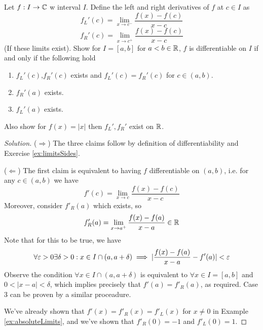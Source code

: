 \begin{exercise} 
  Let $f:I\to\mathbb C$ w interval $I$. Define the left and right derivatives of $f$ at $c\in I$
  as 
  \[f_L'(c) = \lim_{x\to c^-} \frac{f(x)-f(c)}{x-c}\]
  \[f_R'(c) = \lim_{x\to c^+} \frac{f(x)-f(c)}{x-c}\]
  (If these limits exist). Show for $I=[a,b]$ for $a<b\in\mathbb R$, $f$ is differentiable on
  $I$ if and only if the following hold
  \begin{enumerate}
    \item $f_L'(c)$,$f_R'(c)$ exists and $f_L'(c)=f_R'(c)$ for $c\in(a,b)$.
    \item $f_R'(a)$ exists.
    \item $f_L'(a)$ exists.
  \end{enumerate}

  Also show for $f(x)=|x|$ then $f_L',f_R'$ exist on $\mathbb R$.
\end{exercise}
\begin{proof} [Solution]
  ($\Rightarrow$) The three claims follow by definition of differentiability and Exercise
  \ref{ex:limitsSides}.

  ($\Leftarrow$) 
  The first claim is equivalent to having $f$ differentiable on $(a,b)$, i.e. for any $c\in(a,b)$ we
  have 
  \[f'(c)=\lim_{x\to c} \frac{f(x)-f(c)}{x-c}\]
  Moreover, consider $f'_R(a)$ which exists, so
  \[f'_R(a)=\lim_{x\to a^+}\frac{f(x)-f(a)}{x-a} \in\mathbb R\]
  Note that for this to be true, we have 
  \[\forall\varepsilon>0\exists\delta>0 : x\in I\cap (a,a+\delta)\implies
  |\frac{f(x)-f(a)}{x-a} - f'(a)|<\varepsilon\]
  Observe the condition $\forall x\in I\cap (a,a+\delta)$ is equivalent to $\forall x\in
  I=[a,b]$ and $0<|x-a|<\delta$, which implies precisely that
  $f'(a)=f'_R(a)$, as required. Case 3 can be proven by a similar proceadure.

  We've already shown that $f'(x)=f'_R(x)=f'_L(x)$ for $x\neq 0$ in Example
  \ref{ex:absoluteLimits}, and we've shown that $f'_R(0)=-1$ and $f'_L(0)=1$.
\end{proof}

